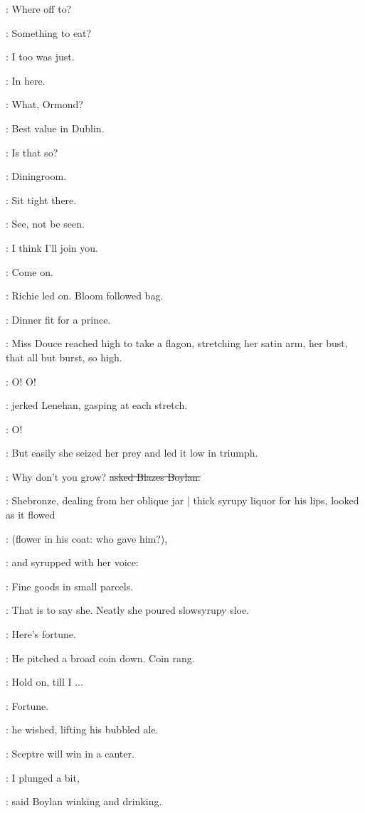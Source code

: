 \goulding:
Where off to?

\BloomInt:
Something to eat?

\goulding:
I too was just.

\BloomInt:
In here.

\goulding:
What, Ormond?

\BloomInt:
Best value in Dublin.

\goulding:
Is that so?

\BloomInt:
Diningroom.

\BloomInt:
Sit tight there.

\BloomInt:
See, not be seen.

\goulding:
I think I'll join you.

\goulding:
Come on.

:
Richie led on.
Bloom followed bag.

\BloomInt:
Dinner fit for a prince.

:
Miss Douce reached high to take a flagon,
stretching her satin arm,
her bust,
that all but burst,
so high.

\lenehan:
O! O!

:
jerked Lenehan,
gasping at each stretch.

\lenehan:
O!

:
But easily she seized her prey and led it low in triumph.

\boylan:
Why don't you grow?
\sout{asked Blazes Boylan.}

:
Shebronze,
dealing from her oblique jar |
thick syrupy liquor for his lips,
looked as it flowed

\BloomInt:
(flower in his coat: who gave him?),

:
and syrupped with her voice:

\MissD:
Fine goods in small parcels.

:
That is to say she.
Neatly she poured slowsyrupy sloe.

\boylan:
Here's fortune.

:
He pitched a broad coin down.
Coin rang.

\lenehan:
Hold on, till I ...

\lenehan:
Fortune.

:
he wished,
lifting his bubbled ale.

\lenehan:
Sceptre will win in a canter.

\boylan:
I plunged a bit,

:
said Boylan winking and drinking.

